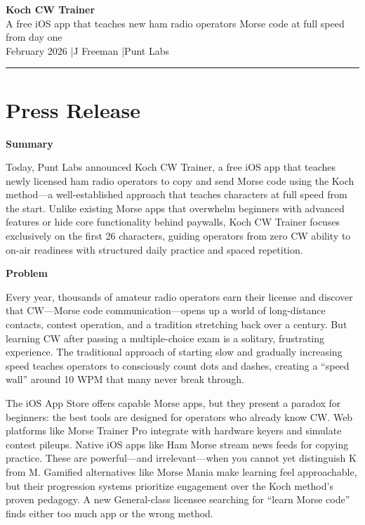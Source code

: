 \documentclass[11pt,letterpaper]{article}
\newcommand{\prsection}[1]{%
  \vspace{1em}%
  {\large\bfseries\color{SectionBlue}#1}%
  \vspace{0.3em}\par%
}
\begin{document}
\begin{center}
  {\LARGE\bfseries\color{SectionBlue} Koch CW Trainer} \\[0.5em]
  {\large\color{AccentGray} A free iOS app that teaches new ham radio operators Morse code at full speed from day one} \\[1.5em]
  {\small\color{AccentGray} February 2026 \quad|\quad J Freeman \quad|\quad Punt Labs}
\end{center}

\vspace{1em}
\textcolor{QuoteBorder}{\rule{\textwidth}{0.8pt}}
\vspace{1em}


\section*{Press Release}

\prsection{Summary}

Today, Punt Labs announced Koch CW Trainer, a free iOS app that teaches newly licensed ham radio operators to copy and send Morse code using the Koch method---a well-established approach that teaches characters at full speed from the start. Unlike existing Morse apps that overwhelm beginners with advanced features or hide core functionality behind paywalls, Koch CW Trainer focuses exclusively on the first 26 characters, guiding operators from zero CW ability to on-air readiness with structured daily practice and spaced repetition.

\prsection{Problem}

Every year, thousands of amateur radio operators earn their license and discover that CW---Morse code communication---opens up a world of long-distance contacts, contest operation, and a tradition stretching back over a century. But learning CW after passing a multiple-choice exam is a solitary, frustrating experience. The traditional approach of starting slow and gradually increasing speed teaches operators to consciously count dots and dashes, creating a ``speed wall'' around 10 WPM that many never break through.

The iOS App Store offers capable Morse apps, but they present a paradox for beginners: the best tools are designed for operators who already know CW. Web platforms like Morse Trainer Pro integrate with hardware keyers and simulate contest pileups. Native iOS apps like Ham Morse stream news feeds for copying practice. These are powerful---and irrelevant---when you cannot yet distinguish K from M. Gamified alternatives like Morse Mania make learning feel approachable, but their progression systems prioritize engagement over the Koch method's proven pedagogy. A new General-class licensee searching for ``learn Morse code'' finds either too much app or the wrong method.
\end{document}
